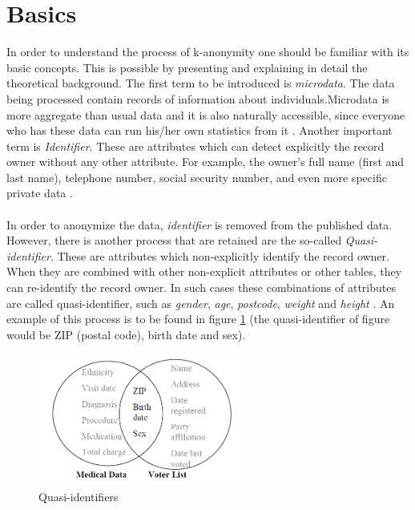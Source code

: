 \documentclass{llncs}
\begin{document}
\section{Basics}
In order to understand the process of k-anonymity one should be familiar with its basic concepts. This is possible by presenting and explaining in detail the theoretical background.  The first term to be introduced is \textit{microdata}. The data being processed contain records of information about individuals.Microdata is more aggregate than usual data and it is also naturally accessible, since everyone who has these data can run his/her own statistics from it \cite{microdataweb}. 
Another important term is \textit{Identifier}. These are attributes which can detect explicitly the record owner without any other attribute. For example, the owner’s full name (first and last name), telephone number, social security number, and even more specific private data \cite{domingo2008critique}.\\\\
In order to anonymize the data, \textit{identifier} is removed from the published data. However, there is another process that are retained are the so-called \textit{Quasi-identifier}. These are attributes which non-explicitly identify the record owner. When they are combined with other non-explicit attributes or other tables, they can re-identify the record owner. In such cases these combinations of attributes are called quasi-identifier, such as \textit{gender}, \textit{age}, \textit{postcode}, \textit{weight} and \textit{height} \cite{dalenius1986finding}. An example of this process is to be found in figure \ref{quasiidentifier} (the quasi-identifier of figure would be ZIP (postal code), birth date and sex).\\
\begin{figure}[]
	\centering
	\includegraphics[width=0.6\textwidth]{linkingdata.png}
	\caption{Quasi-identifiers \cite{sweeney2002k}}%
	\label{quasiidentifier}
\end{figure}\\
\end{document}
